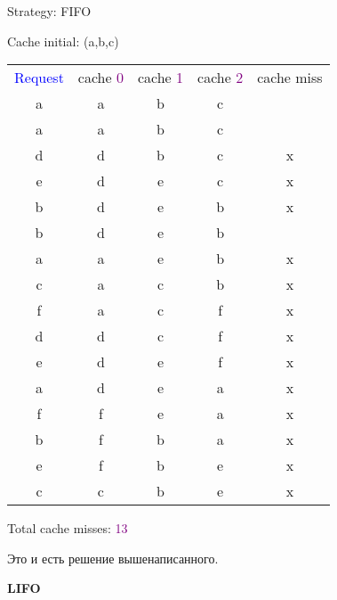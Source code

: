 \begin{tcolorbox}
{
Strategy: FIFO

\vspace{\baselineskip}
 
Cache initial: (a,b,c)
    
\vspace{\baselineskip}
\begin{tabular}{*{5}{c}}
\textcolor{Blue}{Request} & cache \textcolor{Purple}{0} & cache \textcolor{Purple}{1} & cache \textcolor{Purple}{2} & cache miss \\
a & a & b & c & \ \\
a & a & b & c & \ \\
d & d & b & c & x \\
e & d & e & c & x \\
b & d & e & b & x \\
b & d & e & b & \ \\
a & a & e & b & x \\
c & a & c & b & x \\
f & a & c & f & x \\
d & d & c & f & x \\
e & d & e & f & x \\
a & d & e & a & x \\
f & f & e & a & x \\
b & f & b & a & x \\
e & f & b & e & x \\
c & c & b & e & x \\
\end{tabular}
    
    \vspace{\baselineskip}
    
    Total cache misses: \textcolor{Purple}{13}}
\end{tcolorbox}

Это и есть решение вышенаписанного.

\vspace{\baselineskip}

\textbf{LIFO}



